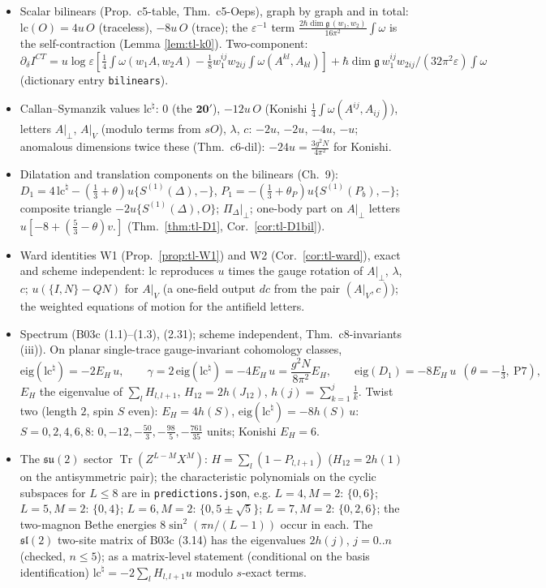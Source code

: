 \documentclass[11pt]{article}
\numberwithin{equation}{section}
\theoremstyle{plain}
\theoremstyle{definition}
\begin{document}
\begin{itemize}
\item[P1] Scalar bilinears (Prop.~c5-table, Thm.~c5-Oeps), graph by graph and in total: $\mathrm{lc}(O)=4u\,O$ (traceless), $-8u\,O$ (trace); the $\varepsilon^{-1}$ term $\frac{2\hbar\dim\mathfrak g\,(w_1,w_2)}{16\pi^2}\int\omega$ is the self-contraction (Lemma \ref{lem:tl-k0}). Two-component: $\partial_\delta I^{CT}=u\log\varepsilon[\tfrac14\int\omega(w_1A,w_2A)-\tfrac18w_1^{ij}w_{2ij}\int\omega(A^{kl},A_{kl})]+\hbar\dim\mathfrak g\,w_1^{ij}w_{2ij}/(32\pi^2\varepsilon)\int\omega$ (dictionary entry \texttt{bilinears}).
\item[P2] Callan--Symanzik values $\mathrm{lc}^\natural$: $0$ (the $\mathbf{20'}$), $-12u\,O$ (Konishi $\tfrac14\int\omega(A^{ij},A_{ij})$), letters $A|_\perp$, $A|_V$ (modulo terms from $sO$), $\lambda$, $c$: $-2u$, $-2u$, $-4u$, $-u$; anomalous dimensions twice these (Thm.~c6-dil): $-24u=\frac{3g^2N}{4\pi^2}$ for Konishi.
\item[P3] Dilatation and translation components on the bilinears (Ch.~9): $D_1=4\,\mathrm{lc}^\natural-(\tfrac13+\theta)u\{S^{(1)}(\Delta),-\}$, $P_1=-(\tfrac13+\theta_P)u\{S^{(1)}(P_b),-\}$; composite triangle $-2u\{S^{(1)}(\Delta),O\}$; $\Pi_\Delta|_\perp$; one-body part on $A|_\perp$ letters $u[-8+(\tfrac53-\theta)v.]$ (Thm.~\ref{thm:tl-D1}, Cor.~\ref{cor:tl-D1bil}).
\item[P4] Ward identities W1 (Prop.~\ref{prop:tl-W1}) and W2 (Cor.~\ref{cor:tl-ward}), exact and scheme independent: $\mathrm{lc}$ reproduces $u$ times the gauge rotation of $A|_\perp$, $\lambda$, $c$; $u(\{I,N\}-QN)$ for $A|_V$ (a one-field output $dc$ from the pair $(A|_V,c)$); the weighted equations of motion for the antifield letters.
\item[P5] Spectrum (B03c (1.1)--(1.3), (2.31); scheme independent, Thm.~c8-invariants (iii)). On planar single-trace gauge-invariant cohomology classes,
\[
\mathrm{eig}(\mathrm{lc}^\natural)=-2E_H\,u,\qquad \gamma=2\,\mathrm{eig}(\mathrm{lc}^\natural)=-4E_H\,u=\frac{g^2N}{8\pi^2}E_H,\qquad \mathrm{eig}(D_1)=-8E_H\,u\ \ (\theta=-\tfrac13,\ \text{P7}),
\]
$E_H$ the eigenvalue of $\sum_lH_{l,l+1}$, $H_{12}=2h(J_{12})$, $h(j)=\sum_{k=1}^j\frac1k$. Twist two (length $2$, spin $S$ even): $E_H=4h(S)$, $\mathrm{eig}(\mathrm{lc}^\natural)=-8h(S)\,u$: $S=0,2,4,6,8$: $0,-12,-\tfrac{50}3,-\tfrac{98}5,-\tfrac{761}{35}$ units; Konishi $E_H=6$.
\item[P6] The $\mathfrak{su}(2)$ sector $\operatorname{Tr}(Z^{L-M}X^M)$: $H=\sum_l(1-P_{l,l+1})$ ($H_{12}=2h(1)$ on the antisymmetric pair); the characteristic polynomials on the cyclic subspaces for $L\le8$ are in \texttt{predictions.json}, e.g. $L=4,M=2$: $\{0,6\}$; $L=5,M=2$: $\{0,4\}$; $L=6,M=2$: $\{0,5\pm\sqrt5\}$; $L=7,M=2$: $\{0,2,6\}$; the two-magnon Bethe energies $8\sin^2(\pi n/(L-1))$ occur in each. The $\mathfrak{sl}(2)$ two-site matrix of B03c (3.14) has the eigenvalues $2h(j)$, $j=0..n$ (checked, $n\le5$); as a matrix-level statement (conditional on the basis identification) $\mathrm{lc}^\natural=-2\sum_lH_{l,l+1}u$ modulo $s$-exact terms.

\end{itemize}
\end{document}
